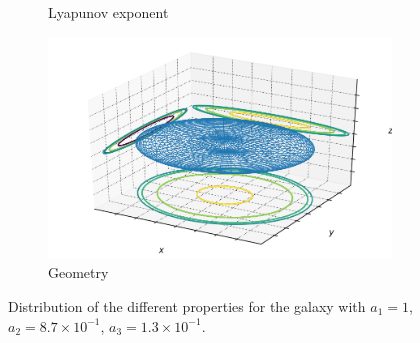 \begin{figure}[h]
\begin{subfigure}[t]{0.4\textwidth}
        \caption{Lyapunov exponent}
    \end{subfigure}
    \begin{subfigure}[t]{0.4\textwidth}
        \includegraphics[width=\textwidth]{"../Files/Week 13/images/17_ellipsoid"}
        \caption{Geometry}
    \end{subfigure}
    \caption{Distribution of the different properties for the galaxy with $a_1 = 1$, $a_2 = 8.7\times10^{-1}$, $a_3 = 1.3\times10^{-1}$.}
    \label{fig: g4}
\end{figure}


